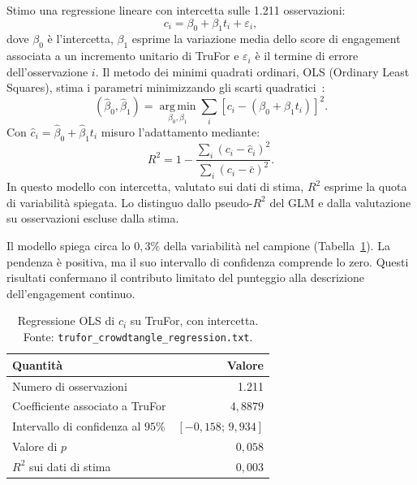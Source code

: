 Stimo una regressione lineare con intercetta sulle 1.211 osservazioni:
\begin{equation}
    c_i=\beta_0+\beta_1t_i+\varepsilon_i,
    \label{eq:materiali-ols}
\end{equation}
dove $\beta_0$ è l'intercetta, $\beta_1$ esprime la variazione media dello score di engagement associata a un incremento unitario di TruFor e $\varepsilon_i$ è il termine di errore dell'osservazione $i$. Il metodo dei minimi quadrati ordinari, OLS (Ordinary Least Squares), stima i parametri minimizzando gli scarti quadratici~\cite{James2013}:
\begin{equation}
    (\widehat\beta_0,\widehat\beta_1)=\operatorname*{arg\,min}_{\beta_0,\beta_1}
    \sum_i[c_i-(\beta_0+\beta_1t_i)]^2.
    \label{eq:materiali-minimi-quadrati}
\end{equation}
Con $\widehat c_i=\widehat\beta_0+\widehat\beta_1t_i$ misuro l'adattamento mediante:
\begin{equation}
    R^2=1-\frac{\sum_i(c_i-\widehat c_i)^2}{\sum_i(c_i-\bar c)^2}.
    \label{eq:materiali-r-quadro}
\end{equation}
In questo modello con intercetta, valutato sui dati di stima, $R^2$ esprime la quota di variabilità spiegata. Lo distinguo dallo pseudo-$R^2$ del GLM e dalla valutazione su osservazioni escluse dalla stima.

Il modello spiega circa lo $0{,}3\%$ della variabilità nel campione (Tabella~\ref{tab:risultati-trufor-lineare}). La pendenza è positiva, ma il suo intervallo di confidenza comprende lo zero. Questi risultati confermano il contributo limitato del punteggio alla descrizione dell'engagement continuo.

\begin{table}[htbp]
    \centering\small
    \caption{Regressione OLS di $c_i$ su TruFor, con intercetta. Fonte: \texttt{trufor\_crowdtangle\_regression.txt}.}
    \label{tab:risultati-trufor-lineare}
    \begin{tabular}{@{}lr@{}}
        \toprule
        Quantità & Valore \\
        \midrule
        Numero di osservazioni & 1.211 \\
        Coefficiente associato a TruFor & $4{,}8879$ \\
        Intervallo di confidenza al $95\%$ & $[-0{,}158;\,9{,}934]$ \\
        Valore di $p$ & $0{,}058$ \\
        $R^2$ sui dati di stima & $0{,}003$ \\
        \bottomrule
    \end{tabular}
\end{table}

